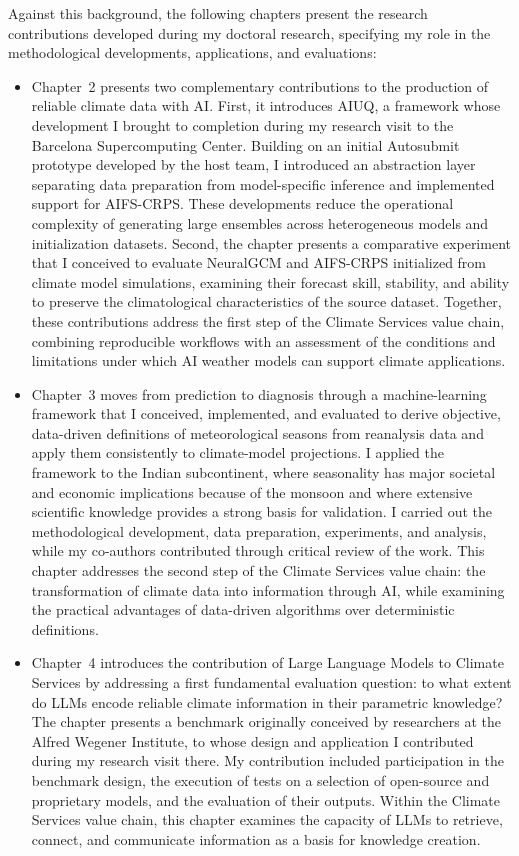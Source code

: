 Against this background, the following chapters present the research contributions developed during my doctoral research, specifying my role in the methodological developments, applications, and evaluations:

\begin{itemize}

\item Chapter~2 presents two complementary contributions to the production of reliable climate data with AI. First, it introduces AIUQ, a framework whose development I brought to completion during my research visit to the Barcelona Supercomputing Center. Building on an initial Autosubmit prototype developed by the host team, I introduced an abstraction layer separating data preparation from model-specific inference and implemented support for AIFS-CRPS. These developments reduce the operational complexity of generating large ensembles across heterogeneous models and initialization datasets. Second, the chapter presents a comparative experiment that I conceived to evaluate NeuralGCM and AIFS-CRPS initialized from climate model simulations, examining their forecast skill, stability, and ability to preserve the climatological characteristics of the source dataset. Together, these contributions address the first step of the Climate Services value chain, combining reproducible workflows with an assessment of the conditions and limitations under which AI weather models can support climate applications.

\item Chapter~3 moves from prediction to diagnosis through a machine-learning framework that I conceived, implemented, and evaluated to derive objective, data-driven definitions of meteorological seasons from reanalysis data and apply them consistently to climate-model projections. I applied the framework to the Indian subcontinent, where seasonality has major societal and economic implications because of the monsoon and where extensive scientific knowledge provides a strong basis for validation. I carried out the methodological development, data preparation, experiments, and analysis, while my co-authors contributed through critical review of the work. This chapter addresses the second step of the Climate Services value chain: the transformation of climate data into information through AI, while examining the practical advantages of data-driven algorithms over deterministic definitions.

\item Chapter~4 introduces the contribution of Large Language Models to Climate Services by addressing a first fundamental evaluation question: to what extent do LLMs encode reliable climate information in their parametric knowledge? The chapter presents a benchmark originally conceived by researchers at the Alfred Wegener Institute, to whose design and application I contributed during my research visit there. My contribution included participation in the benchmark design, the execution of tests on a selection of open-source and proprietary models, and the evaluation of their outputs. Within the Climate Services value chain, this chapter examines the capacity of LLMs to retrieve, connect, and communicate information as a basis for knowledge creation.


\end{itemize}
